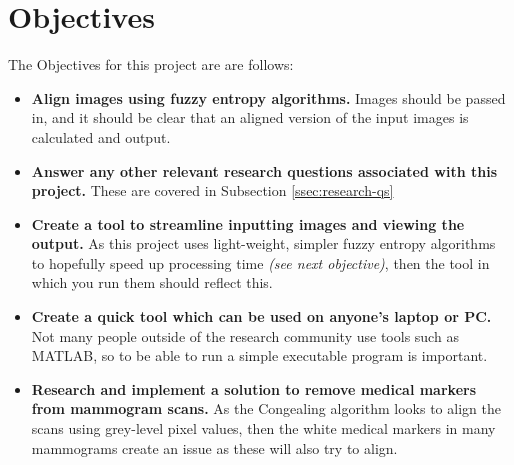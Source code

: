 \section{Objectives}
\label{sec:objectives}

The Objectives for this project are are follows:

\begin{itemize}
  \item \textbf{Align images using fuzzy entropy algorithms.} Images should be passed in, and it should be clear that an aligned version of the input images is calculated and output.
  \item \textbf{Answer any other relevant research questions associated with this project.} These are covered in Subsection \ref{ssec:research-qs}
  \item \textbf{Create a tool to streamline inputting images and viewing the output.} As this project uses light-weight, simpler fuzzy entropy algorithms to hopefully speed up processing time \textit{(see next objective)}, then the tool in which you run them should reflect this.
  \item \textbf{Create a quick tool which can be used on anyone's laptop or PC.} Not many people outside of the research community use tools such as MATLAB, so to be able to run a simple executable program is important.
  \item \textbf{Research and implement a solution to remove medical markers from mammogram scans.} As the \Gls{Congealing} algorithm looks to align the scans using grey-level pixel values, then the white medical markers in many mammograms create an issue as these will also try to align.
\end{itemize}
